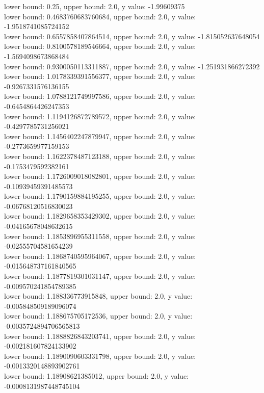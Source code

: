 \documentclass[12pt]{article}
\begin{document}
\begin{enumerate}
\begin{footnotesize}
\begin{spacing}{-.8}
lower bound: 0.25, upper bound: 2.0, y value: -1.99609375\\
lower bound: 0.4683760683760684, upper bound: 2.0, y value: -1.9518741085724152\\
lower bound: 0.6557858407864514, upper bound: 2.0, y value: -1.815052637648054\\
lower bound: 0.8100578189546664, upper bound: 2.0, y value: -1.5694098673868484\\
lower bound: 0.9300050113311887, upper bound: 2.0, y value: -1.251931866272392\\
lower bound: 1.0178339391556377, upper bound: 2.0, y value: -0.9267331576136155\\
lower bound: 1.0788121749997586, upper bound: 2.0, y value: -0.6454864426247353\\
lower bound: 1.1194126872789572, upper bound: 2.0, y value: -0.4297785731256021\\
lower bound: 1.1456402247879947, upper bound: 2.0, y value: -0.2773659977159153\\
lower bound: 1.1622378487123188, upper bound: 2.0, y value: -0.1753479592382161\\
lower bound: 1.1726009018082801, upper bound: 2.0, y value: -0.10939459391485573\\
lower bound: 1.1790159884195255, upper bound: 2.0, y value: -0.06768120516830023\\
lower bound: 1.1829658353429302, upper bound: 2.0, y value: -0.04165678048632615\\
lower bound: 1.1853896955311558, upper bound: 2.0, y value: -0.02555704581654239\\
lower bound: 1.1868740595964067, upper bound: 2.0, y value: -0.015648737161840565\\
lower bound: 1.1877819301031147, upper bound: 2.0, y value: -0.009570241854789385\\
lower bound: 1.188336773915848, upper bound: 2.0, y value: -0.005848509189096074\\
lower bound: 1.188675705172536, upper bound: 2.0, y value: -0.0035724894706565813\\
lower bound: 1.1888826843203741, upper bound: 2.0, y value: -0.002181607824133902\\
lower bound: 1.1890090603331798, upper bound: 2.0, y value: -0.0013320148893902761\\
lower bound: 1.18908621385012, upper bound: 2.0, y value: -0.0008131987448745104\\

\end{spacing}
\end{footnotesize}
\end{enumerate}
\end{document}
